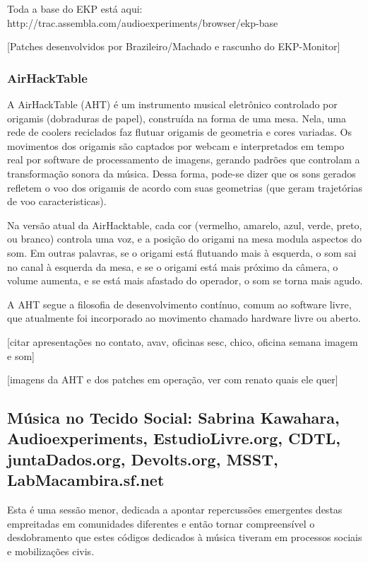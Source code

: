 Toda a base do EKP está aqui: http://trac.assembla.com/audioexperiments/browser/ekp-base

[Patches desenvolvidos por Brazileiro/Machado e rascunho do EKP-Monitor]

\subsubsection{AirHackTable}

A AirHackTable (AHT) é um instrumento musical eletrônico controlado por
origamis (dobraduras de papel), construída na forma de uma mesa. Nela,
uma rede de coolers reciclados faz flutuar origamis de geometria e
cores variadas. Os movimentos dos origamis são captados por webcam e
interpretados em tempo real por software de processamento de imagens,
gerando padrões que controlam a transformação sonora da música. Dessa
forma, pode-se dizer que os sons gerados refletem o voo dos origamis
de acordo com suas geometrias (que geram trajetórias de voo
caracteristicas).

Na versão atual da AirHacktable, cada cor (vermelho, amarelo, azul,
verde, preto, ou branco) controla uma voz, e a posição do origami na
mesa modula aspectos do som. Em outras palavras, se o origami está
flutuando mais à esquerda, o som sai no canal à esquerda da mesa, e se
o origami está mais próximo da câmera, o volume aumenta, e se está
mais afastado do operador, o som se torna mais agudo.

A AHT segue a filosofia de desenvolvimento contínuo, comum ao software
livre, que atualmente foi incorporado ao movimento chamado hardware
livre ou aberto.

[citar apresentações no contato, avav, oficinas sesc, chico, oficina semana imagem e som]

[imagens da AHT e dos patches em operação, ver com renato quais ele quer]

\subsection{Música no Tecido Social: Sabrina Kawahara, Audioexperiments, EstudioLivre.org, CDTL, juntaDados.org, Devolts.org, MSST, LabMacambira.sf.net}

Esta é uma sessão menor, dedicada a apontar repercussões emergentes
destas empreitadas em comunidades diferentes e então tornar
compreensível o desdobramento que estes códigos dedicados à música
tiveram em processos sociais e mobilizações civis.

